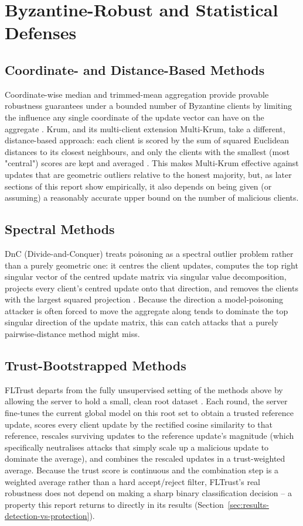 \section{Byzantine-Robust and Statistical Defenses}
\label{sec:lit-defenses}

\subsection{Coordinate- and Distance-Based Methods}
Coordinate-wise median and trimmed-mean aggregation provide provable robustness guarantees under a bounded number of Byzantine clients by limiting the influence any single coordinate of the update vector can have on the aggregate \citep{byzantine}. Krum, and its multi-client extension Multi-Krum, take a different, distance-based approach: each client is scored by the sum of squared Euclidean distances to its closest neighbours, and only the clients with the smallest (most "central") scores are kept and averaged \citep{krum}. This makes Multi-Krum effective against updates that are geometric outliers relative to the honest majority, but, as later sections of this report show empirically, it also depends on being given (or assuming) a reasonably accurate upper bound on the number of malicious clients.

\subsection{Spectral Methods}
DnC (Divide-and-Conquer) treats poisoning as a spectral outlier problem rather than a purely geometric one: it centres the client updates, computes the top right singular vector of the centred update matrix via singular value decomposition, projects every client's centred update onto that direction, and removes the clients with the largest squared projection \citep{dnc}. Because the direction a model-poisoning attacker is often forced to move the aggregate along tends to dominate the top singular direction of the update matrix, this can catch attacks that a purely pairwise-distance method might miss.

\subsection{Trust-Bootstrapped Methods}
FLTrust departs from the fully unsupervised setting of the methods above by allowing the server to hold a small, clean root dataset \citep{fltrust}. Each round, the server fine-tunes the current global model on this root set to obtain a trusted reference update, scores every client update by the rectified cosine similarity to that reference, rescales surviving updates to the reference update's magnitude (which specifically neutralises attacks that simply scale up a malicious update to dominate the average), and combines the rescaled updates in a trust-weighted average. Because the trust score is continuous and the combination step is a weighted average rather than a hard accept/reject filter, FLTrust's real robustness does not depend on making a sharp binary classification decision -- a property this report returns to directly in its results (Section~\ref{sec:results-detection-vs-protection}).

